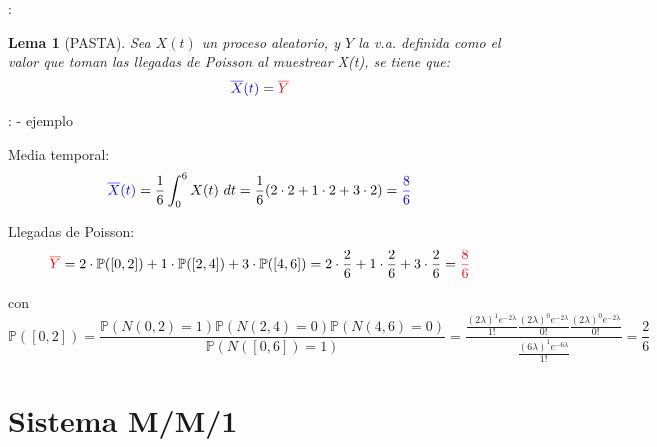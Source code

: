 \documentclass[xcolor={x11names}]{beamer}
\newtheorem{lema}{Lema}[section]
\newcommand{\red}[1]{{\color{red}#1}}
\newcommand{\blue}[1]{{\color{blue}#1}}
\begin{document}
\begin{frame}{\secname: \subsecname}
    \begin{lema}[PASTA]
        Sea \blue{$X(t)$} un proceso aleatorio,
        y \red{$Y$} la v.a. definida como el
        valor que toman las llegadas de Poisson
        al muestrear \blue{X(t)}, se tiene que:
        \begin{equation}
            \blue{\overline{X}(t)} = \red{\overline{Y}}
        \end{equation}
    \end{lema}
\end{frame}




\begin{frame}{\secname: \subsecname - ejemplo}

    Media temporal: 
    \begin{equation*}
        \blue{\overline{X}(t)}=\frac{1}{6}\int_0^6 X(t)\ dt =\frac{1}{6} (2\cdot2 + 1\cdot2 + 3\cdot2) = \blue{\frac{8}{6}}
    \end{equation*}

    Llegadas de Poisson:
    \begin{equation*}
        \red{\overline{Y}} = 2\cdot\mathbb{P}([0,2]) + 1 \cdot\mathbb{P}([2,4]) + 3\cdot \mathbb{P}([4,6])=2\cdot\frac{2}{6} + 1 \cdot\frac{2}{6}+ 3\cdot\frac{2}{6}=\red{\frac{8}{6}}
    \end{equation*}

    \vfill

    \begin{figure}
        \resizebox{.4\textwidth}{!}{%
        }
    \end{figure}

    \vfill

    con
    \begin{equation*}%
        \scriptstyle
        \mathbb{P}([0,2])=\frac{\mathbb{P}(N(0,2)=1)\mathbb{P}(N(2,4)=0)\mathbb{P}(N(4,6)=0)}{\mathbb{P}(N([0,6])=1)}
                          =\frac{\frac{(2\lambda)^1e^{-2\lambda}}{1!} \frac{(2\lambda)^0e^{-2\lambda}}{0!} \frac{(2\lambda)^0e^{-2\lambda}}{0!} }{\frac{(6\lambda)^1e^{-6\lambda}}{1!}}=\frac{2}{6}%
    \end{equation*}%
\end{frame}






\section{Sistema M/M/1}
\end{document}
